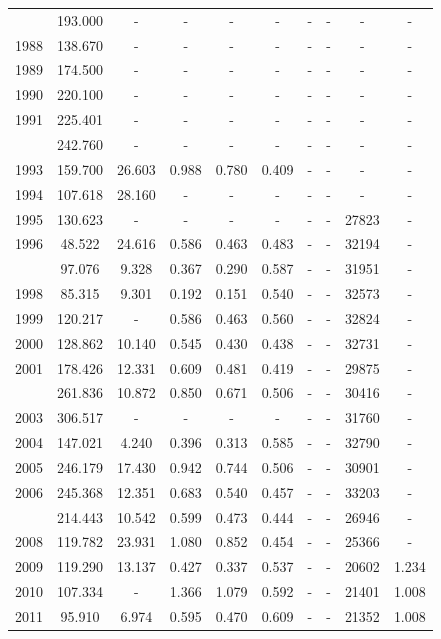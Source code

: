 \documentclass[
  12pt,
]{article}
\begin{document}
\begin{longtable}[t]{cccccccccc}
\endfoot
\bottomrule
\endlastfoot
1987 & 193.000 & - & - & - & - & - & - & - & -\\
1988 & 138.670 & - & - & - & - & - & - & - & -\\
1989 & 174.500 & - & - & - & - & - & - & - & -\\
1990 & 220.100 & - & - & - & - & - & - & - & -\\
1991 & 225.401 & - & - & - & - & - & - & - & -\\
\addlinespace
1992 & 242.760 & - & - & - & - & - & - & - & -\\
1993 & 159.700 & 26.603 & 0.988 & 0.780 & 0.409 & - & - & - & -\\
1994 & 107.618 & 28.160 & - & - & - & - & - & - & -\\
1995 & 130.623 & - & - & - & - & - & - & 27823 & -\\
1996 & 48.522 & 24.616 & 0.586 & 0.463 & 0.483 & - & - & 32194 & -\\
\addlinespace
1997 & 97.076 & 9.328 & 0.367 & 0.290 & 0.587 & - & - & 31951 & -\\
1998 & 85.315 & 9.301 & 0.192 & 0.151 & 0.540 & - & - & 32573 & -\\
1999 & 120.217 & - & 0.586 & 0.463 & 0.560 & - & - & 32824 & -\\
2000 & 128.862 & 10.140 & 0.545 & 0.430 & 0.438 & - & - & 32731 & -\\
2001 & 178.426 & 12.331 & 0.609 & 0.481 & 0.419 & - & - & 29875 & -\\
\addlinespace
2002 & 261.836 & 10.872 & 0.850 & 0.671 & 0.506 & - & - & 30416 & -\\
2003 & 306.517 & - & - & - & - & - & - & 31760 & -\\
2004 & 147.021 & 4.240 & 0.396 & 0.313 & 0.585 & - & - & 32790 & -\\
2005 & 246.179 & 17.430 & 0.942 & 0.744 & 0.506 & - & - & 30901 & -\\
2006 & 245.368 & 12.351 & 0.683 & 0.540 & 0.457 & - & - & 33203 & -\\
\addlinespace
2007 & 214.443 & 10.542 & 0.599 & 0.473 & 0.444 & - & - & 26946 & -\\
2008 & 119.782 & 23.931 & 1.080 & 0.852 & 0.454 & - & - & 25366 & -\\
2009 & 119.290 & 13.137 & 0.427 & 0.337 & 0.537 & - & - & 20602 & 1.234\\
2010 & 107.334 & - & 1.366 & 1.079 & 0.592 & - & - & 21401 & 1.008\\
2011 & 95.910 & 6.974 & 0.595 & 0.470 & 0.609 & - & - & 21352 & 1.008\\

\end{longtable}
\end{document}
